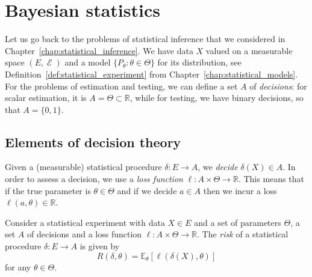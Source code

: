 \documentclass[
	fontsize=11pt, %
	twoside=false, %
	numbers=noenddot, %
]{kaobook}
\DeclareMathOperator{\cE}{{\mathcal E}}
\newcommand{\E}{\mathbb E}
\newcommand{\R}{\mathbb R}
\newcommand{\go}{\rightarrow}
\begin{document}
\mainmatter %








% 


\setchapterpreamble[u]{\margintoc}
\chapter{Bayesian statistics}
\label{chap:bayesian_statistics}

Let us go back to the problems of statistical inference that we considered in Chapter~\ref{chap:statistical_inference}.
We have data $X$ valued on a measurable space $(E, \cE)$ and a model $\{ P_\theta : \theta \in \Theta\}$ for its distribution, see Definition~\ref{def:statistical_experiment} from Chapter~\ref{chap:statistical_models}.
For the problems of estimation and testing, we can define a set $A$ of \emph{decisions}: for scalar estimation, it is $A = \Theta \subset \R$, while for testing, we have binary decisions, so that $A = \{ 0, 1 \}$.

\section{Elements of decision theory} %
\label{sec:elements_of_decision_theory}

Given a (measurable) statistical procedure $\delta : E \go A$, we \emph{decide} $\delta(X) \in A$.
In order to assess a decision, we use a \emph{loss function} $\ell : A \times \Theta \go \R$.
This means that if the true parameter is $\theta \in \Theta$ and if we decide $a \in A$ then we incur a loss $\ell(a, \theta) \in \R$.

\begin{definition}
	Consider a statistical experiment with data $X \in E$ and a set of parameters $\Theta$, a set $A$ of decisions and a loss function $\ell : A \times \Theta \go \R$. The \emph{risk} of a statistical procedure $\delta : E \go A$ is given by
	\begin{equation*}
		R(\delta, \theta) = \E_\theta[ \ell(\delta(X), \theta)]
	\end{equation*}
	for any $\theta \in \Theta$.
\end{definition}
\end{document}
